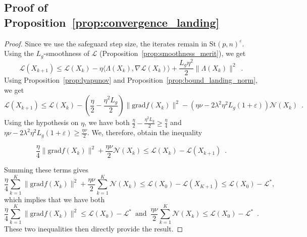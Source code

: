 \documentclass[twoside,11pt]{article}
\newcommand{\grad}{{\mathrm{grad}}}
\newcommand{\stiefel}{{\mathrm{St}(p, n)}}
\begin{document}
\subsection{Proof of Proposition~\ref{prop:convergence_landing}}
\begin{proof}
Since we use the safeguard step size, the iterates remain in $\stiefel^\varepsilon$.
  Using the $L_g$-smoothness of $\mathcal{L}$ (Proposition~\ref{prop:smoothness_merit}), we get
  $$
  \mathcal{L}(X_{k+1})\leq \mathcal{L}(X_k) - \eta \langle \Lambda(X_k), \nabla \mathcal{L}(X_k)\rangle + \frac{L_g\eta^2}2\|\Lambda(X_k)\|^2 \enspace.
  $$
  Using Proposition~\ref{prop:lyapunov} and Proposition~\ref{prop:bound_landing_norm}, we get
  $$
  \mathcal{L}(X_{k+1}) \leq \mathcal{L}(X_k) - (\frac\eta2 - \frac{\eta^2L_g}2)\|\grad f(X_k)\|^2 -(\eta\nu -2\lambda^2\eta^2L_g(1+\varepsilon))\mathcal{N}(X_k)\enspace.
  $$
  Using the hypothesis on $\eta$, we have both $\frac\eta2 - \frac{\eta^2L_g}2 \geq \frac\eta4$ and $\eta\nu -2\lambda^2\eta^2L_g(1+\varepsilon) \geq \frac{\eta\nu}2$. We, therefore, obtain the inequality
  
  $$
  \frac{\eta}4\|\grad f(X_k)\|^2 + \frac{\eta\nu}2 \mathcal{N}(X_k) \leq \mathcal{L}(X_k) - \mathcal{L}(X_{k+1})\enspace.
  $$
  
  Summing these terms gives
  \begin{equation}
       \frac{\eta}4\sum_{k=1}^K\|\grad f(X_k)\|^2 + \frac{\eta\nu}2 \sum_{k=1}^K\mathcal{N}(X_k) \leq \mathcal{L}(X_0) - \mathcal{L}(X_{K+1}) \leq \mathcal{L}(X_0) - \mathcal{L}^*,
  \end{equation}
which implies that we have both
\begin{equation}
    \frac{\eta}4\sum_{k=1}^K\|\grad f(X_k)\|^2 \leq \mathcal{L}(X_0) - \mathcal{L}^*\enspace \text{and} \enspace
    \frac{\eta\nu}2 \sum_{k=1}^K\mathcal{N}(X_k)  \leq \mathcal{L}(X_0) - \mathcal{L}^*\enspace.
\end{equation}
These two inequalities then directly provide the result.
\end{proof}
\end{document}

